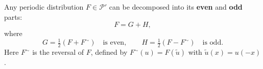 Any periodic distribution $F \in \mathcal{P}'$ can be decomposed into its \textbf{even} and \textbf{odd} parts:
$$F = G + H,$$
where
$$G = \tfrac{1}{2}(F + F^\sim) \quad \text{is even}, \qquad H = \tfrac{1}{2}(F - F^\sim) \quad \text{is odd}.$$
Here $F^\sim$ is the reversal of $F$, defined by $F^\sim(u) = F(\tilde{u})$ with $\tilde{u}(x) = u(-x)$.
